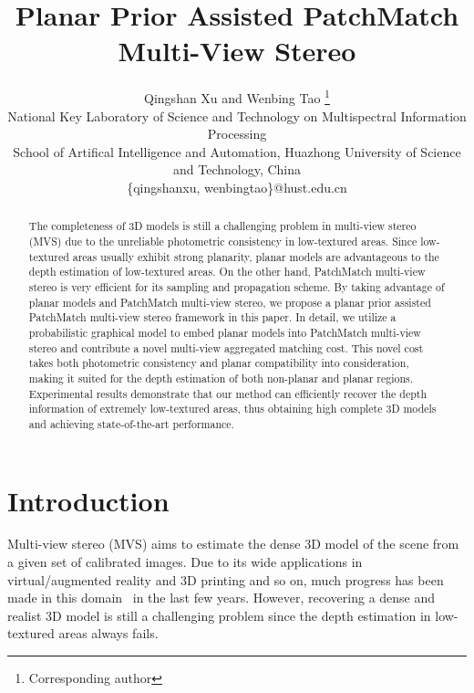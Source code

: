 \documentclass[letterpaper]{article} %
\title{Planar Prior Assisted PatchMatch Multi-View Stereo}
\author{Qingshan Xu and Wenbing Tao%
	\thanks{Corresponding author}\\
	National Key Laboratory of Science and Technology on Multispectral Information Processing\\ %
	School of Artifical Intelligence and Automation, Huazhong University of Science and Technology, China\\
	\{qingshanxu, wenbingtao\}@hust.edu.cn %
}
\begin{document}
\maketitle

\begin{abstract}
The completeness of 3D models is still a challenging problem in multi-view stereo (MVS) due to the unreliable photometric consistency in low-textured areas. Since low-textured areas usually exhibit strong planarity, planar models are advantageous to the depth estimation of low-textured areas. On the other hand, PatchMatch multi-view stereo is very efficient for its sampling and propagation scheme. By taking advantage of planar models and PatchMatch multi-view stereo, we propose a planar prior assisted PatchMatch multi-view stereo framework in this paper. In detail, we utilize a probabilistic graphical model to embed planar models into PatchMatch multi-view stereo and contribute a novel multi-view aggregated matching cost. This novel cost takes both photometric consistency and planar compatibility into consideration, making it suited for the depth estimation of both non-planar and planar regions. Experimental results demonstrate that our method can efficiently recover the depth information of extremely low-textured areas, thus obtaining high complete 3D models and achieving state-of-the-art performance.
\end{abstract}

\section{Introduction}

Multi-view stereo (MVS) aims to estimate the dense 3D model of the scene from a given set of calibrated images. Due to its wide applications in virtual/augmented reality and 3D printing and so on, much progress has been made in this domain~\cite{Furukawa2010Accurate,Strecha2006Combined,Merrell2007Real,Goesele2007Multi,Liu2009Continuous,Schonberger2016Pixelwise} in the last few years. However, recovering a dense and realist 3D model is still a challenging problem since the depth estimation in low-textured areas always fails.
\end{document}

